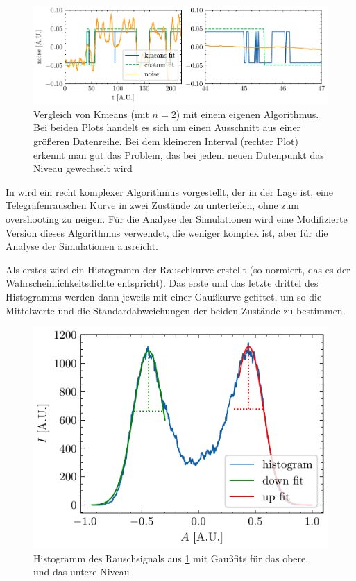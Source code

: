 \documentclass[main.tex]{subfiles}
\begin{document}
\begin{figure}[h]
    \centering
    \includegraphics{bilder/plots/theo-vis/telegraph_fit_comp.pdf}
    \caption{Vergleich von Kmeans (mit \(n=2\)) mit einem eigenen Algorithmus. Bei beiden Plots handelt es sich um einen Ausschnitt aus einer größeren Datenreihe. Bei dem kleineren Interval (rechter Plot) erkennt man gut das Problem, das bei jedem neuen Datenpunkt das Niveau gewechselt wird}\label{fig:fit_comp}
\end{figure}


In \cite{random-telegraph-analysis} wird ein recht komplexer Algorithmus vorgestellt, der in der Lage ist, eine Telegrafenrauschen Kurve in zwei Zustände zu unterteilen, ohne zum overshooting zu neigen. Für die Analyse der Simulationen wird eine Modifizierte Version dieses Algorithmus verwendet, die weniger komplex ist, aber für die Analyse der Simulationen ausreicht.


Als erstes wird ein Histogramm der Rauschkurve erstellt (so normiert, das es der Wahrscheinlichkeitsdichte entspricht). 
Das erste und das letzte drittel des Histogramms werden dann jeweils mit einer Gaußkurve gefittet, um so die Mittelwerte und die Standardabweichungen der beiden Zustände zu bestimmen.

\begin{figure}[h]
    \centering
    \includegraphics{bilder/plots/theo-vis/hist_fit.pdf}
    \caption{Histogramm des Rauschsignals aus \cref{fig:fit_comp} mit Gaußfits für das obere, und das untere Niveau}
\end{figure}
\end{document}
